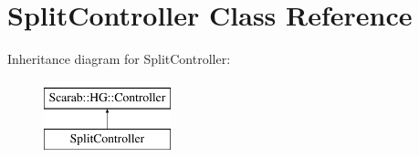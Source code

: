 \hypertarget{classSplitController}{
\section{SplitController Class Reference}
\label{classSplitController}
}
Inheritance diagram for SplitController:\begin{figure}[H]
\begin{center}
\leavevmode
\includegraphics[height=2cm]{classSplitController}
\end{center}
\end{figure}
